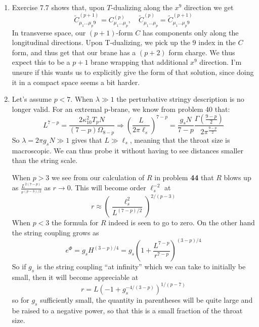\documentclass[11pt, class=article, crop=false]{standalone}
\begin{document}
\begin{enumerate}
	
	\item Exercise 7.7 shows that, upon $T$-dualizing along the $x^9$ direction we get
	\[
		\tilde C^{(p+1)}_{\mu_1 \dots \mu_p 9} = C^{(p)}_{\mu_1 \dots \mu_p}, \quad \tilde C^{(p)}_{\mu_1 \dots \mu_p} = \tilde C^{(p+1)}_{\mu_1 \dots \mu_p 9} 
	\]
	In transverse space, our $(p+1)$-form $C$ has components only along the longitudinal directions. Upon T-dualizing, we pick up the $9$ index in the $C$ form, and thus get that our brane has a $(p+2)$ form charge. We thus expect this to be a $p+1$ brane wrapping that additional $x^9$ direction. I'm unsure if this wants us to explicitly give the form of that solution, since doing it in a compact space seems a bit harder. 
	
	\item Let's assume $p<7$. When $\lambda \gg 1$ the perturbative stringy description is no longer valid. For an extremal p-brane, we know from problem 40 that:
	\[
		L^{7-p} = \frac{2\kappa_{10}^2 T_p N}{(7-p) \Omega_{8-p}} \Rightarrow  \left(\frac{L}{2\pi \ell_s} \right)^{7-p} = \frac{g_s N}{7-p} \frac{\Gamma(\frac{9-p}{2})}{2 \pi^{\frac{9-p}{2}}}
	\]
	So $\lambda = 2\pi g_s N \gg 1$ gives that $L \gg \ell_s$, meaning that the throat size is macroscopic. We can thus probe it without having to see distances smaller than the string scale. 
	
	When $p > 3$ we see from our  calculation of $R$ in problem \textbf{44} that $R$ blows up as $\frac{L^{2(7-p)}}{r^{(p-3)/2}}$ as $r \to 0$. This will become order $\ell_s^{-2}$ at 
	\[
		r \approx \left(\frac{\ell_s^2}{L^{(7-p)/2}}\right)^{2/(p-3)}
	\]	
	When $p < 3$ the formula for $R$ indeed is seen to go to zero. On the other hand the string coupling grows as
	\[
		e^{\Phi} = g_s H^{(3-p)/4} = g_s \left(1 + \frac{L^{7-p}}{r^{7-p}} \right)^{(3-p)/4}
	\]
	So if $g_s$ is the string coupling ``at infinity'' which we can take to initially be small, then it will become appreciable at
	\[
		r = L (-1 + g_s^{-4/(3-p)})^{1/(p-7)}
	\]
	so for $g_s$ sufficiently small, the quantity in parentheses will be quite large and be raised to a negative power, so that this is a small fraction of the throat size. 
	

\end{enumerate}
\end{document}
